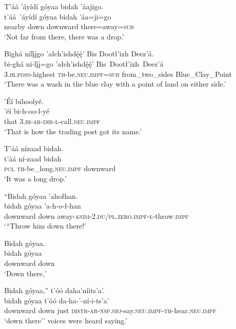 \ea\label{ex:text1-41-2}
T’áá ’áyídí góyaa bidah ’áajigo.\\
\gll t’áá~{’áyídí}	góyaa	bidah	’áa=ji=go\\
     nearby	down	downward	there=away=\textsc{sub}\\
\glt `Not far from there, there was a drop.'
\z

\newpage
\ea\label{ex:text1-41-3}
Bighá nílį́įgo ’ałch’ishdę́ę́’ Bis Dootł’izh Deez’á.\\
\gll bi-ghá	ni-lį́į=go	’ałch’ishdę́ę́’	Bis~Dootł’izh~{Deez’á}\\
     3.\textsc{bi}.\textsc{poss}-highest	\textsc{th}-be.\textsc{neu}.\textsc{impf}=\textsc{sub}	from\_two\_sides	Blue\_Clay\_Point\\
\glt `There was a wash in the blue clay with a point of land on either side.'
\z

\ea\label{ex:text1-41-4}
’Éí bihoolyé.\\
\gll ’éí	bi-h-oo-l-yé\\
     that	3.\textsc{bi}-\textsc{ar}-\textsc{dir}-\textsc{l}-call.\textsc{neu}.\textsc{impf}\\
\glt `That is how the trading post got its name.'
\z

\ea\label{ex:text1-41-5}
T’áá nízaad bidah.\\
\gll t’áá	ní-zaad	bidah\\
     \textsc{pcl}	\textsc{th}-be\_long.\textsc{neu}.\textsc{impf}	downward\\
\glt `It was a long drop.'
\z

\ea\label{ex:text1-42-1}
``Bidah góyaa ’ahołhan.\\
\gll bidah	góyaa	’a-h-o-ł-han\\
     downward	down	away-\textsc{anim}-2.\textsc{du}/\textsc{pl}.\textsc{zero}.\textsc{impf}-\textsc{ł}-throw.\textsc{impf}\\
\glt `{``}Throw him down there!'
\z

\ea\label{ex:text1-42-2}
Bidah góyaa.\\
\gll bidah	góyaa\\
     downward	down\\
\glt `Down there,'
\z

\ea\label{ex:text1-42-3}
Bidah góyaa,'' t’óó daha’níits’a’.\\
\gll bidah	góyaa	t’óó	da-ha-’-ní-i-ts’a’\\
     downward	down	just	\textsc{distr}-\textsc{ar}-\textsc{nsp}.\textsc{sbj}-say.\textsc{neu}.\textsc{impf}-\textsc{th}-hear.\textsc{neu}.\textsc{impf}\\
\glt `down there'' voices were heard saying.'
\z

